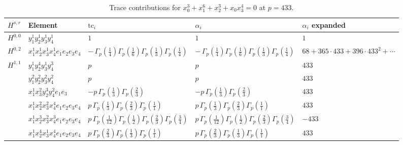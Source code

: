 \documentclass[11pt]{article}
\begin{document}
\begin{table}[ht]
\centering
\caption{Trace contributions for $x_0^{3} + x_1^{6} + x_2^{3} + x_0 x_3^{4} = 0$ at $p=433$.}\label{tab:deformed-7}
\renewcommand{\arraystretch}{1.1}
{\scriptsize
\begin{tabular}{@{}lllll@{}}
\toprule
$H^{s,r}$ & Element & $\mathrm{tc}_i$ & $\alpha_i$ & $\alpha_i$ expanded \\
\midrule
$H^{0,0}$ & $y_{1}^{1} y_{2}^{1} y_{3}^{1} y_{4}^{1}$ & $1$ & $1$ & $1$ \\
\midrule
$H^{0,2}$ & $x_{1}^{1} x_{2}^{1} x_{3}^{1} x_{4}^{1}  e_{1} e_{2} e_{3} e_{4}$ & $- \, \Gamma_p \left( \frac{1}{4} \right) \Gamma_p \left( \frac{1}{6} \right) \Gamma_p \left( \frac{1}{3} \right) \Gamma_p \left( \frac{1}{4} \right)$ & $- \, \Gamma_p \left( \frac{1}{4} \right) \Gamma_p \left( \frac{1}{6} \right) \Gamma_p \left( \frac{1}{3} \right) \Gamma_p \left( \frac{1}{4} \right)$ & $68{+}365{\cdot}433{+}396{\cdot}433^{2}{+}\cdots$ \\
\midrule
$H^{1,1}$ & $y_{1}^{1} y_{2}^{4} y_{3}^{1} y_{4}^{3}$ & $p \,$ & $p \,$ & $433$ \\
 & $y_{1}^{2} y_{2}^{2} y_{3}^{2} y_{4}^{2}$ & $p \,$ & $p \,$ & $433$ \\
 & $x_{1}^{1} x_{3}^{2} y_{2}^{3} y_{4}^{2} e_{1} e_{3}$ & $- p \, \Gamma_p \left( \frac{1}{3} \right) \Gamma_p \left( \frac{2}{3} \right)$ & $- p \, \Gamma_p \left( \frac{1}{3} \right) \Gamma_p \left( \frac{2}{3} \right)$ & $433$ \\
 & $x_{1}^{1} x_{2}^{2} x_{3}^{2} x_{4}^{4}  e_{1} e_{2} e_{3} e_{4}$ & $p \, \Gamma_p \left( \frac{1}{3} \right) \Gamma_p \left( \frac{2}{3} \right) \Gamma_p \left( \frac{1}{1} \right)$ & $p \, \Gamma_p \left( \frac{1}{3} \right) \Gamma_p \left( \frac{2}{3} \right) \Gamma_p \left( \frac{1}{1} \right)$ & $433$ \\
 & $x_{1}^{1} x_{2}^{3} x_{3}^{2} x_{4}^{3}  e_{1} e_{2} e_{3} e_{4}$ & $p \, \Gamma_p \left( \frac{1}{12} \right) \Gamma_p \left( \frac{1}{2} \right) \Gamma_p \left( \frac{2}{3} \right) \Gamma_p \left( \frac{3}{4} \right)$ & $p \, \Gamma_p \left( \frac{1}{12} \right) \Gamma_p \left( \frac{1}{2} \right) \Gamma_p \left( \frac{2}{3} \right) \Gamma_p \left( \frac{3}{4} \right)$ & $-433$ \\
 & $x_{1}^{1} x_{2}^{4} x_{3}^{1} x_{4}^{4}  e_{1} e_{2} e_{3} e_{4}$ & $p \, \Gamma_p \left( \frac{2}{3} \right) \Gamma_p \left( \frac{1}{3} \right) \Gamma_p \left( \frac{1}{1} \right)$ & $p \, \Gamma_p \left( \frac{2}{3} \right) \Gamma_p \left( \frac{1}{3} \right) \Gamma_p \left( \frac{1}{1} \right)$ & $433$ \\

\end{tabular}}
\end{table}
\end{document}
